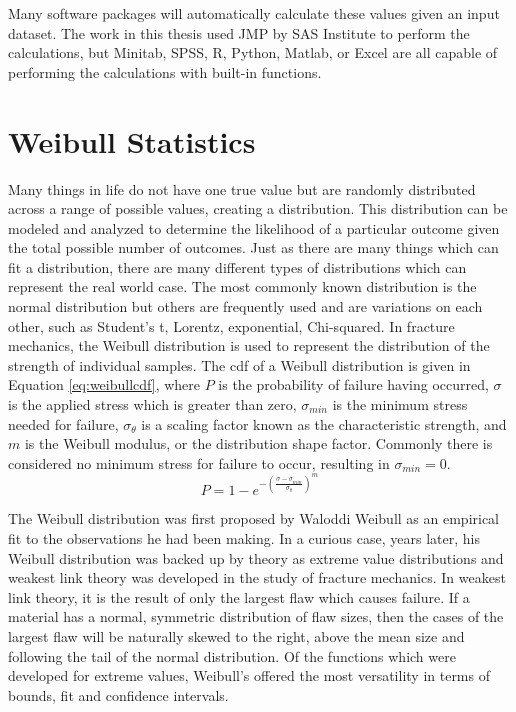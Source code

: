     Many software packages will automatically calculate these values given an input dataset.
    The work in this thesis used JMP by SAS Institute to perform the calculations, but Minitab, SPSS, R, Python, Matlab, or Excel are all capable of performing the calculations with built-in functions.

\section{Weibull Statistics}
    \label{app:weibull}
    Many things in life do not have one true value but are randomly distributed across a range of possible values, creating a distribution.
    This distribution can be modeled and analyzed to determine the likelihood of a particular outcome given the total possible number of outcomes.
    Just as there are many things which can fit a distribution, there are many different types of distributions which can represent the real world case.
    The most commonly known distribution is the normal distribution but others are frequently used and are variations on each other, such as Student's t, Lorentz, exponential, Chi-squared.
    In fracture mechanics, the Weibull distribution is used to represent the distribution of the strength of individual samples.
    The \gls{cdf} of a Weibull distribution is given in Equation \ref{eq:weibullcdf}, where $P$ is the probability of failure having occurred, $\sigma$ is the applied stress which is greater than zero, $\sigma_{min}$ is the minimum stress needed for failure, $\sigma_\theta$ is a scaling factor known as the characteristic strength, and $m$ is the Weibull modulus, or the distribution shape factor.\cite{Weibull1951}
    Commonly there is considered no minimum stress for failure to occur, resulting in $\sigma_{min} = 0$.
    \begin{equation}
        \label{eq:weibullcdf}
        P=1-e^{-\left(\frac{\sigma - \sigma_{min}}{\sigma_\theta}\right)^m}
    \end{equation}

    The Weibull distribution was first proposed by Waloddi Weibull as an empirical fit to the observations he had been making.
    In a curious case, years later, his Weibull distribution was backed up by theory as extreme value distributions and weakest link theory was developed in the study of fracture mechanics.\cite{Quinn2010}
    In weakest link theory, it is the result of only the largest flaw which causes failure.
    If a material has a normal, symmetric distribution of flaw sizes, then the cases of the largest flaw will be naturally skewed to the right, above the mean size and following the tail of the normal distribution.
    Of the functions which were developed for extreme values, Weibull's offered the most versatility in terms of bounds, fit and confidence intervals.

